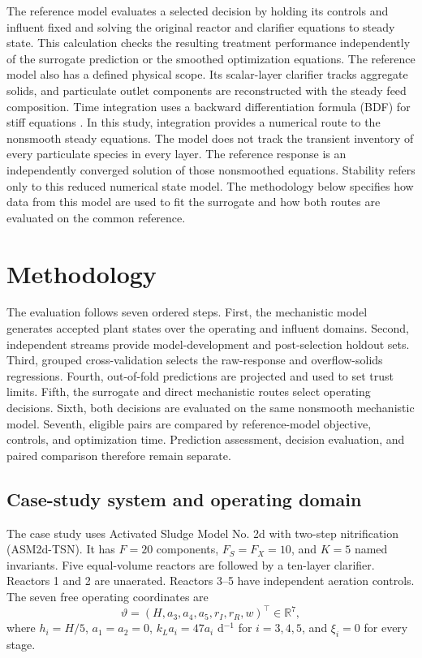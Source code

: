 \documentclass[a4paper,fleqn]{cas-sc}
\newcommand{\R}{\mathbb{R}}
\begin{document}
The reference model evaluates a selected decision by holding its controls and influent fixed and solving the original reactor and clarifier equations to steady state. This calculation checks the resulting treatment performance independently of the surrogate prediction or the smoothed optimization equations. The reference model also has a defined physical scope. Its scalar-layer clarifier tracks aggregate solids, and particulate outlet components are reconstructed with the steady feed composition. Time integration uses a backward differentiation formula (BDF) for stiff equations \citep{CurtissHirschfelder1952}. In this study, integration provides a numerical route to the nonsmooth steady equations. The model does not track the transient inventory of every particulate species in every layer. The reference response is an independently converged solution of those nonsmoothed equations. Stability refers only to this reduced numerical state model. The methodology below specifies how data from this model are used to fit the surrogate and how both routes are evaluated on the common reference.

\section{Methodology}

The evaluation follows seven ordered steps. First, the mechanistic model generates accepted plant states over the operating and influent domains. Second, independent streams provide model-development and post-selection holdout sets. Third, grouped cross-validation selects the raw-response and overflow-solids regressions. Fourth, out-of-fold predictions are projected and used to set trust limits. Fifth, the surrogate and direct mechanistic routes select operating decisions. Sixth, both decisions are evaluated on the same nonsmooth mechanistic model. Seventh, eligible pairs are compared by reference-model objective, controls, and optimization time. Prediction assessment, decision evaluation, and paired comparison therefore remain separate.

\subsection{Case-study system and operating domain}

The case study uses Activated Sludge Model No. 2d with two-step nitrification (ASM2d-TSN). It has $F=20$ components, $F_S=F_X=10$, and $K=5$ named invariants. Five equal-volume reactors are followed by a ten-layer clarifier. Reactors 1 and 2 are unaerated. Reactors 3--5 have independent aeration controls. The seven free operating coordinates are
\begin{equation}
\vartheta=(H,a_3,a_4,a_5,r_I,r_R,w)^\top\in\R^7,
\label{eq:casecontrols}
\end{equation}
where $h_i=H/5$, $a_1=a_2=0$, $k_La_i=47a_i$ d$^{-1}$ for $i=3,4,5$, and $\xi_i=0$ for every stage.
\end{document}
